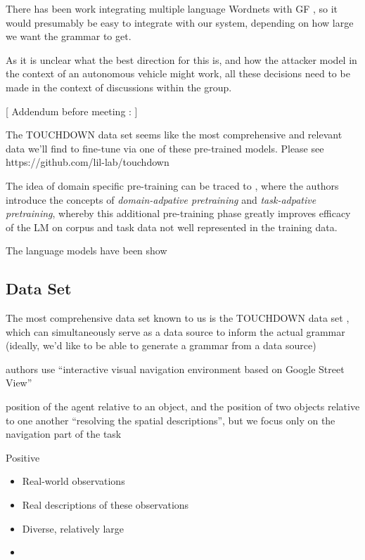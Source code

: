 \documentclass[a4paper, 11pt]{article}
\begin{document}
There has been work integrating multiple language Wordnets with GF
\cite{virk2014developing}, so it would presumably be easy to integrate with our
system, depending on how large we want the grammar to get.


As it is unclear what the best direction for this is, and how the attacker model
in the context of an autonomous vehicle might work, all these decisions need to
be made in the context of discussions within the group.

[ Addendum before meeting : ]

The TOUCHDOWN data set \cite{chen2019touchdown} seems like the most
comprehensive and relevant data we'll find to fine-tune via one of these
pre-trained models. Please see https://github.com/lil-lab/touchdown


The idea of domain specific pre-training can be traced to
\cite{gururangan-etal-2020-dont}, where the authors introduce the concepts of
\emph{domain-adpative pretraining} and \emph{task-adpative pretraining}, whereby
this additional pre-training phase greatly improves efficacy of the LM on
corpus and task data not well represented in the training data.

The language models have been show \cite{bioBert}

\subsection{Data Set}

The most comprehensive data set known to us is the TOUCHDOWN data set
\cite{chen2019touchdown}, which can simultaneously serve as a data source to
inform the actual grammar (ideally, we'd like to be able to generate a grammar
from a data source)

authors use ``interactive visual navigation environment based on Google Street
View''

position of the agent relative to an object, and the position of two objects
relative to one another
``resolving the spatial descriptions'', but we focus only on the navigation part
of the task

Positive

\begin{itemize}
\item Real-world observations
\item Real descriptions of these observations
\item Diverse, relatively large
\item
\end{itemize}
\end{document}
